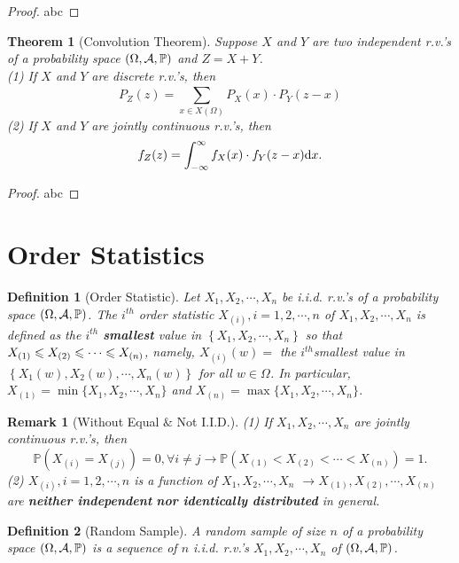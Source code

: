 \documentclass[openany,12pt]{book}
\newtheorem{theorem}{Theorem}[chapter]
\newtheorem{remark}{Remark}[chapter]
\newtheorem{definition}{Definition}[chapter]
\begin{document}
\begin{proof}
  abc
\end{proof}

\begin{theorem}[Convolution Theorem]
  Suppose $X$ and $Y$ are two independent r.v.'s of a probability space $(\Omega,\mathcal{A},\mathbb{P})$ and $Z = X + Y$.\\
  (1) If $X$ and $Y$ are discrete r.v.'s, then
  \[P_{Z}(z)= \sum_{x \in X(\Omega)}^{}{P_{X}(x) \cdot}P_{Y}(z-x)\]
  (2) If $X$ and $Y$ are jointly continuous r.v.'s, then
  \[f_{Z}(z)= \int_{- \infty}^{\infty}{f_{X}(x) \cdot f_{Y}(z-x)\mathrm{d} x}.\]
\end{theorem}

\begin{proof}
  abc
\end{proof}

\section{Order Statistics}

\begin{definition}[Order Statistic]
  Let $X_{1}, X_{2}, \cdots,X_{n}$ be i.i.d. r.v.'s of a probability space $(\Omega,\mathcal{A},\mathbb{P})$. The $i^{th}$ order statistic $X_{(i)},  i = 1,2, \cdots,n$
  of $X_{1}, X_{2}, \cdots,X_{n}$ is defined as the $i^{th}$
  \textbf{smallest} value in $\left\{ X_{1}, X_{2}, \cdots,X_{n} \right\}$ so that
  $X_{(1)} \leqslant X_{(2)} \leqslant \cdots\leqslant X_{(n)}$, namely, $X_{\left( i \right)}(w)=$ the $i^{th} $smallest value in $\left\{ X_{1}(w), X_{2}(w), \cdots,X_{n}(w) \right\}$ for all $w \in \Omega$. In particular,
  $X_{(1)} = \min\{ X_{1}, X_{2}, \cdots,X_{n}\}$ and $X_{(n)} = \max\{ X_{1}, X_{2}, \cdots,X_{n}\}$.
\end{definition}

\begin{remark}[Without Equal $\&$ Not I.I.D.]
  (1) If $X_{1}, X_{2}, \cdots,X_{n}$ are jointly continuous r.v.'s, then
  \[\mathbb{P}\left( X_{\left( i \right)} = X_{\left( j \right)} \right)= 0, \forall i \neq j   \to \mathbb{P}\left( X_{\left( 1 \right)} < X_{\left( 2 \right)} < \cdots< X_{\left( n \right)} \right)= 1.\]
  (2) $X_{(i)},  i = 1,2, \cdots,n$ is a function of $X_{1}, X_{2}, \cdots,X_{n}$ $\to X_{(1)},X_{(2)}, \cdots,X_{(n)}$ are \textbf{neither independent} \textbf{nor identically distributed} in general.
\end{remark}

\begin{definition}[Random Sample]
  A random sample of size $n$ of a probability space $(\Omega,\mathcal{A},\mathbb{P})$ is a sequence of $n$ i.i.d. r.v.'s $X_1, X_2, \cdots,X_n$ of $(\Omega,\mathcal{A},\mathbb{P})$.
\end{definition}
\end{document}
